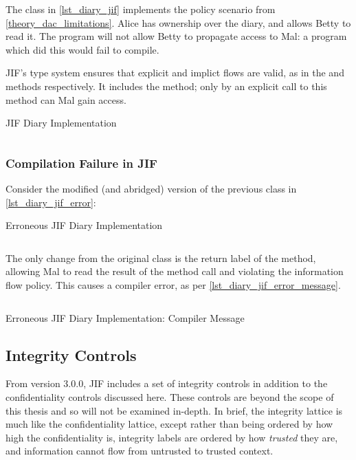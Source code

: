 The class in \autoref{lst_diary_jif} implements the policy scenario from \ref{theory_dac_limitations}. Alice has ownership over the diary, and allows Betty to read it. The program will not allow Betty to propagate access to Mal: a program which did this would fail to compile.

JIF's type system ensures that explicit and implict flows are valid, as in the  and  methods respectively. It includes the  method; only by an explicit call to this method can Mal gain access.

\begin{listing}[!ht]
	\caption{JIF Diary Implementation}
	\inputminted{java}{content/code_sections/jif_para_bg/Diary.jif}
	\label{lst_diary_jif}
\end{listing}

\clearpage

\subsubsection{Compilation Failure in JIF}

Consider the modified (and abridged) version of the previous class in \autoref{lst_diary_jif_error}:

\begin{listing}[!ht]
	\caption{Erroneous JIF Diary Implementation}
	\inputminted{java}{content/code_sections/jif_para_bg/DiaryError.jif}
	\label{lst_diary_jif_error}
\end{listing}

The only change from the original  class is the return label of the  method, allowing Mal to read the result of the method call and violating the information flow policy. This causes a compiler error, as per \autoref{lst_diary_jif_error_message}.

\begin{listing}[!ht]
	\inputminted[fontsize=\footnotesize]{text}{content/code_sections/jif_para_bg/DiaryError_message_jif.txt}
	\caption{Erroneous JIF Diary Implementation: Compiler Message}
	\label{lst_diary_jif_error_message}
\end{listing}

\clearpage

\subsection{Integrity Controls}

From version 3.0.0, JIF includes a set of integrity controls in addition to the confidentiality controls discussed here. These controls are beyond the scope of this thesis and so will not be examined in-depth. In brief, the integrity lattice is much like the confidentiality lattice, except rather than being ordered by how high the confidentiality is, integrity labels are ordered by how \textit{trusted} they are, and information cannot flow from untrusted to trusted context.

